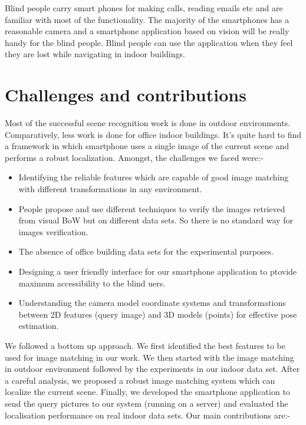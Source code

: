 Blind people carry smart phones for making calls, 
reading emails etc and are familiar with most of 
the functionality. The majority of the smartphones 
has a reasonable camera and a 
smartphone application based on vision 
will be really handy 
for the blind people. Blind people can use the 
application when they feel they are lost 
while navigating in indoor buildings. 

\section{Challenges and contributions}
\label{sec:contributions}
Most of the successful scene recognition work is 
done in outdoor environments. 
Comparatively, less work is done for office indoor buildings.
It's quite hard to find a framework in which smartphone 
uses a single image of the current scene and 
performs a robust localization. Amongst, the challenges 
we faced were:-

\begin{itemize}

\item Identifying the reliable features
which are capable of good image matching 
with different transformations 
in any environment. 


\item People propose and use different techniques to verify 
the images retrieved from visual BoW but 
on different data sets. 
So there is no standard way for
images verification. 

\item The absence of office building data sets 
for the experimental purposes. 

\item Designing a user friendly interface 
for our smartphone application to 
ptovide maximum accessibility to the 
blind uers.


\item Understanding the camera model coordinate 
systems and transformations 
between 2D features (query image) 
and 3D models (points) for effective pose estimation.

\end{itemize}

We followed a bottom up approach. We first identified the 
best features to be used for image matching 
in our work. We then started with the 
image matching in outdoor environment 
followed by the experiments in our indoor data set. 
After a careful analysis, we proposed a 
robust image matching system which 
can localize the current scene. Finally, we 
developed the smartphone application to send 
the query pictures to our system (running on a 
server) and evaluated the localisation performance 
on real indoor data sets. 
Our main contributions are:-


